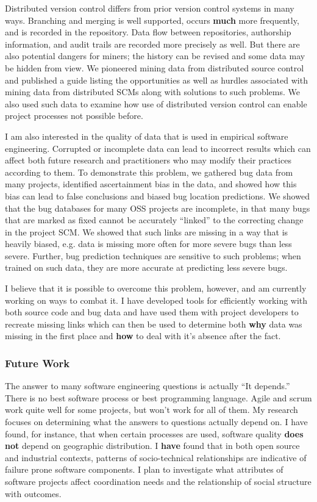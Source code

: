 \documentclass[10pt]{article}
\newcommand\Section[1]{\subsubsection*{\large #1}}
\begin{document}
\begin{small}
Distributed version control differs from prior version control systems in many
ways.  Branching and merging is well supported, occurs \textbf{much} more
frequently, and is recorded in the repository.  Data flow between repositories,
authorship information, and audit trails are recorded more precisely as well.
But there are also potential dangers for miners; the history can be revised and
some data may be hidden from view.  We pioneered mining data from distributed
source control and published a guide listing the opportunities as well as
hurdles associated with mining data from distributed SCMs along with solutions
to such problems.  We also used such data to examine how use of distributed version 
control can enable project processes not possible before.

I am also interested in the quality of data that is used in empirical software
engineering.  Corrupted or incomplete data can lead to incorrect results which
can affect both future research and practitioners who may modify their
practices according to them.  To demonstrate this problem, we gathered bug data
from many projects, identified ascertainment bias in the data, and showed how
this bias can lead to false conclusions and biased bug location predictions.
We showed that the bug databases for many OSS projects are incomplete, in that
many bugs that are marked as fixed cannot be accurately ``linked'' to the
correcting change in the project SCM.  We showed that such links are missing in
a way that is heavily biased, e.g. data is missing more often for more severe
bugs than less severe. Further, bug prediction techniques are sensitive
to such problems; when trained on such data, they are more accurate at predicting
less severe bugs.

I believe that it is possible to overcome this problem, however, and am
currently working on ways to combat it.  I have developed tools for efficiently
working with both source code and bug data and have used them with project
developers to recreate missing links which can then be used to determine both
\textbf{why} data was missing in the first place and \textbf{how} to deal with
it's absence after the fact.

\Section{Future Work}

The answer to many software engineering questions is actually
``It depends.'' There is no best software process or best programming
language.  Agile and scrum work quite well for some projects, but won't work for all
of them.  My research focuses on determining what the answers to questions
actually depend on.  I have found, for instance, that when certain processes
are used, software quality \textbf{does not} depend on geographic distribution.
I \textbf{have} found that in both open source and industrial contexts,
patterns of socio-technical relationships are indicative of failure prone
software components.  I plan to investigate what attributes of software
projects affect coordination needs and the relationship of social structure 
with outcomes.


\end{small}
\end{document}
